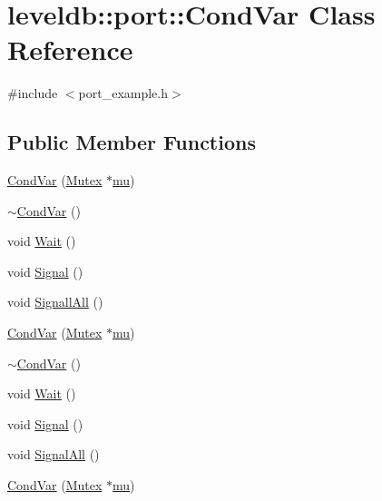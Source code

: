 \hypertarget{classleveldb_1_1port_1_1_cond_var}{}\section{leveldb\+:\+:port\+:\+:Cond\+Var Class Reference}
\label{classleveldb_1_1port_1_1_cond_var}


{\ttfamily \#include $<$port\+\_\+example.\+h$>$}

\subsection*{Public Member Functions}
\begin{DoxyCompactItemize}
\item 
\hyperlink{classleveldb_1_1port_1_1_cond_var_abb23c74c7b58298a20d4cfd6a0c5839a}{Cond\+Var} (\hyperlink{classleveldb_1_1port_1_1_mutex}{Mutex} $\ast$\hyperlink{db__impl_8cc_a900dad9ea326bf70a183d88a8ab50a13}{mu})
\item 
\hyperlink{classleveldb_1_1port_1_1_cond_var_abf5e80198afeeccf1ee1b9af848d0cf6}{$\sim$\+Cond\+Var} ()
\item 
void \hyperlink{classleveldb_1_1port_1_1_cond_var_a9e9855595a3f3a3ccf47949696065597}{Wait} ()
\item 
void \hyperlink{classleveldb_1_1port_1_1_cond_var_ac36a2038b058b24886741c99e4a7d7d4}{Signal} ()
\item 
void \hyperlink{classleveldb_1_1port_1_1_cond_var_a516114902b0ac99e541d74f182faa7b4}{Signall\+All} ()
\item 
\hyperlink{classleveldb_1_1port_1_1_cond_var_abb23c74c7b58298a20d4cfd6a0c5839a}{Cond\+Var} (\hyperlink{classleveldb_1_1port_1_1_mutex}{Mutex} $\ast$\hyperlink{db__impl_8cc_a900dad9ea326bf70a183d88a8ab50a13}{mu})
\item 
\hyperlink{classleveldb_1_1port_1_1_cond_var_abf5e80198afeeccf1ee1b9af848d0cf6}{$\sim$\+Cond\+Var} ()
\item 
void \hyperlink{classleveldb_1_1port_1_1_cond_var_a9e9855595a3f3a3ccf47949696065597}{Wait} ()
\item 
void \hyperlink{classleveldb_1_1port_1_1_cond_var_ac36a2038b058b24886741c99e4a7d7d4}{Signal} ()
\item 
void \hyperlink{classleveldb_1_1port_1_1_cond_var_ad7725662f3c1bc542100c41081d1428a}{Signal\+All} ()
\item 
\hyperlink{classleveldb_1_1port_1_1_cond_var_abb23c74c7b58298a20d4cfd6a0c5839a}{Cond\+Var} (\hyperlink{classleveldb_1_1port_1_1_mutex}{Mutex} $\ast$\hyperlink{db__impl_8cc_a900dad9ea326bf70a183d88a8ab50a13}{mu})

\end{DoxyCompactItemize}
